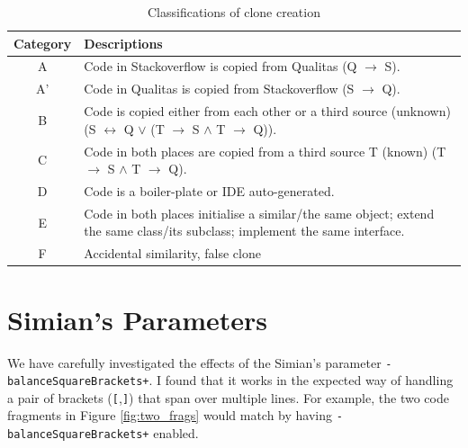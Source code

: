 \documentclass{IEEEtran}
\begin{document}
\begin{table}[H]
	\centering
	\caption{Classifications of clone creation}
	\label{tab:classification_scheme}
	\begin{tabular}{|c|p{13cm}|}
		\hline 
		Category & Descriptions \\ 
		\hline 
		A & Code in Stackoverflow is copied from Qualitas (Q $\rightarrow$ S). \\ 
		\hline 
		A' & Code in Qualitas is copied from Stackoverflow (S $\rightarrow$ Q). \\ 
		\hline 
		B & Code is copied either from each other or a third source (unknown) (S $\leftrightarrow$ Q $\vee$ (T $\rightarrow$ S $\wedge$ T $\rightarrow$ Q)).
		\\ 
		\hline 
		C & Code in both places are copied from a third source T (known) (T $\rightarrow$ S $\wedge$ T $\rightarrow$ Q).
		\\ 
		\hline 
		D & Code is a boiler-plate or IDE auto-generated.
		\\ 
		\hline 
		E & Code in both places initialise a similar/the same object; extend the same class/its subclass; implement the same interface.
		\\ 
		\hline 
		F & Accidental similarity, false clone \\ 
		\hline 
	\end{tabular} 
\end{table}



\newpage

\section*{Simian's Parameters}

We have carefully investigated the effects of the Simian's parameter \texttt{-balanceSquareBrackets+}. I found that it works in the expected way of handling a pair of brackets (\texttt{[},\texttt{]}) that span over multiple lines. For example, the two code fragments in Figure \ref{fig:two_frags} would match by having \texttt{-balanceSquareBrackets+} enabled.
\end{document}
